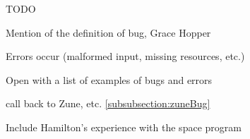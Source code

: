

TODO

Mention of the definition of bug, Grace Hopper


Errors occur (malformed input, missing resources, etc.)

Open with a list of examples of bugs and errors 

call back to Zune, etc. \ref{subsubsection:zuneBug}

Include Hamilton's experience with the space program


